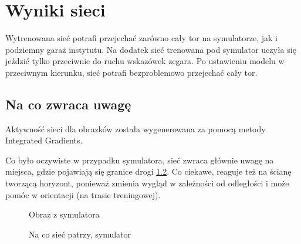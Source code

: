 \chapter{Wyniki sieci}
Wytrenowana sieć potrafi przejechać zarówno cały tor na symulatorze, jak i
podziemny garaż instytutu. Na dodatek sieć trenowana pod symulator uczyła się
 jeździć tylko przeciwnie do ruchu wskazówek zegara. Po ustawieniu modelu w przeciwnym
kierunku, sieć potrafi bezproblemowo przejechać cały tor.

\section{Na co zwraca uwagę}
Aktywność sieci dla obrazków została wygenerowana za pomocą metody
Integrated Gradients\cite{ig}.

Co było oczywiste w przypadku symulatora, sieć zwraca głównie uwagę na miejsca,
gdzie pojawiają się granice drogi \ref{sim_act}. Co ciekawe, reaguje też na ścianę
tworzącą horyzont, ponieważ zmienia wygląd w zależności od odległości i może
pomóc w orientacji (na trasie treningowej).
\begin{figure}
  \centering
  \caption{Obraz z symulatora}
  \label{sim_img}
\end{figure}
\begin{figure}
  \centering
  \caption{Na co sieć patrzy, symulator}
  \label{sim_act}
\end{figure}
